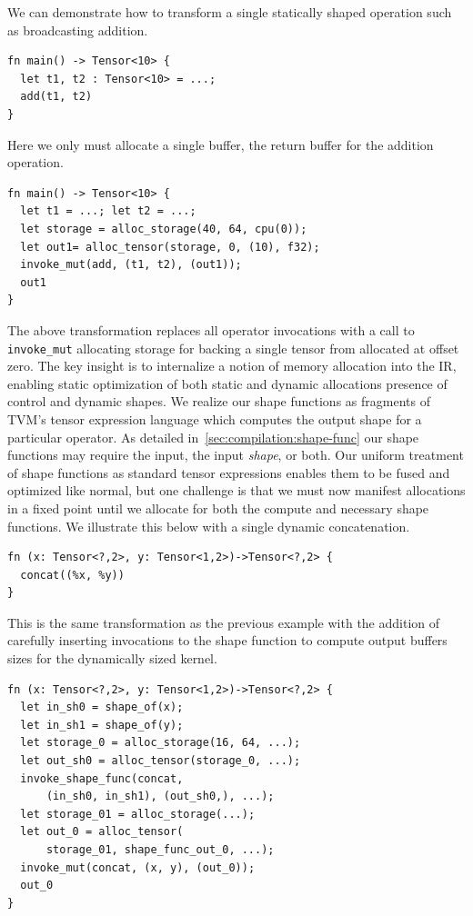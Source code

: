 We can demonstrate how to transform a single statically shaped operation such as broadcasting addition.

\begin{verbatim}
fn main() -> Tensor<10> {
  let t1, t2 : Tensor<10> = ...;
  add(t1, t2)
}
\end{verbatim}

Here we only must allocate a single buffer, the return buffer for the addition operation.

\begin{verbatim}
fn main() -> Tensor<10> {
  let t1 = ...; let t2 = ...;
  let storage = alloc_storage(40, 64, cpu(0));
  let out1= alloc_tensor(storage, 0, (10), f32);
  invoke_mut(add, (t1, t2), (out1));
  out1
}
\end{verbatim}

The above transformation replaces all operator invocations with a call to \verb|invoke_mut| allocating storage
for backing a single tensor from allocated at offset zero.
The key insight is to internalize a notion of memory allocation into the IR, enabling static optimization of
both static and dynamic allocations presence of control and dynamic shapes. We realize our shape functions as fragments of TVM's tensor expression language which computes the output shape for a particular operator. As detailed in~\autoref{sec:compilation:shape-func} our shape functions may require the input, the input \textit{shape}, or both.
Our uniform treatment of shape functions as standard tensor expressions enables them to be fused and optimized like normal, but one challenge is that we must now manifest allocations in a fixed point until we allocate for both the compute and necessary shape functions. We illustrate this below with a single dynamic concatenation.

\begin{verbatim}
fn (x: Tensor<?,2>, y: Tensor<1,2>)->Tensor<?,2> {
  concat((%x, %y))
}
\end{verbatim}

This is the same transformation as the previous example with the addition of carefully inserting
invocations to the shape function to compute output buffers sizes for the dynamically sized kernel.

\begin{verbatim}
fn (x: Tensor<?,2>, y: Tensor<1,2>)->Tensor<?,2> {
  let in_sh0 = shape_of(x);
  let in_sh1 = shape_of(y);
  let storage_0 = alloc_storage(16, 64, ...);
  let out_sh0 = alloc_tensor(storage_0, ...);
  invoke_shape_func(concat,
      (in_sh0, in_sh1), (out_sh0,), ...);
  let storage_01 = alloc_storage(...);
  let out_0 = alloc_tensor(
      storage_01, shape_func_out_0, ...);
  invoke_mut(concat, (x, y), (out_0));
  out_0
}
\end{verbatim}

